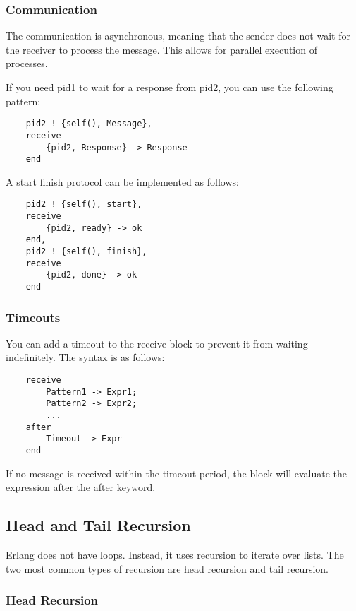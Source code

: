 \subsubsection{Communication}

The communication is asynchronous, meaning that the sender does not wait for the receiver to process the message. This allows for parallel execution of processes.

If you need pid1 to wait for a response from pid2, you can use the following pattern:

\begin{verbatim}
    pid2 ! {self(), Message},
    receive
        {pid2, Response} -> Response
    end
\end{verbatim}

A start finish protocol can be implemented as follows:

\begin{verbatim}
    pid2 ! {self(), start},
    receive
        {pid2, ready} -> ok
    end,
    pid2 ! {self(), finish},
    receive
        {pid2, done} -> ok
    end
\end{verbatim}

\subsubsection{Timeouts}

You can add a timeout to the receive block to prevent it from waiting indefinitely. The syntax is as follows:

\begin{verbatim}
    receive
        Pattern1 -> Expr1;
        Pattern2 -> Expr2;
        ...
    after
        Timeout -> Expr
    end
\end{verbatim}

If no message is received within the timeout period, the block will evaluate the expression after the after keyword.

\subsection{Head and Tail Recursion}

Erlang does not have loops. Instead, it uses recursion to iterate over lists. The two most common types of recursion are head recursion and tail recursion.

\subsubsection{Head Recursion}

